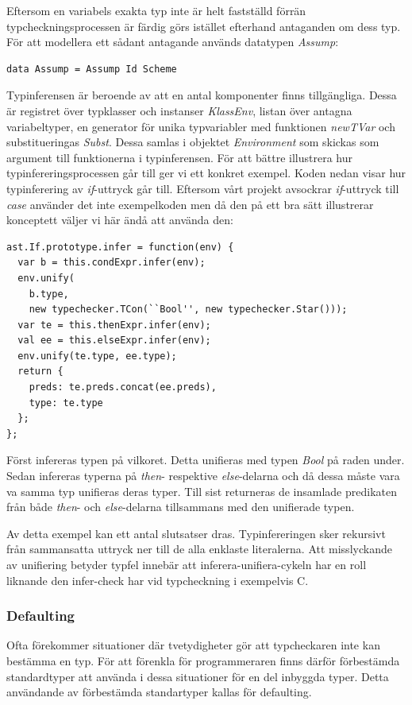 Eftersom en variabels exakta typ inte är helt fastställd förrän typcheckningsprocessen är färdig görs istället efterhand antaganden om dess typ. För att modellera ett sådant antagande används datatypen \emph{Assump}:
\begin{lstlisting}
data Assump = Assump Id Scheme
\end{lstlisting}

Typinferensen är beroende av att en antal komponenter finns tillgängliga. Dessa är registret över typklasser och instanser \emph{KlassEnv}, listan över antagna variabeltyper, en generator för unika typvariabler med funktionen \emph{newTVar} och substitueringas \emph{Subst}. Dessa samlas i objektet \emph{Environment} som skickas som argument till funktionerna i typinferensen. 
För att bättre illustrera hur typinfereringsprocessen går till ger vi ett konkret exempel. Koden nedan visar hur typinferering av \emph{if}-uttryck går till. Eftersom vårt projekt avsockrar \emph{if}-uttryck till \emph{case} använder det inte exempelkoden men då den på ett bra sätt illustrerar konceptett väljer vi här ändå att använda den:

\begin{lstlisting}
ast.If.prototype.infer = function(env) {
  var b = this.condExpr.infer(env);
  env.unify(
    b.type,
    new typechecker.TCon(``Bool'', new typechecker.Star()));
  var te = this.thenExpr.infer(env);
  val ee = this.elseExpr.infer(env);
  env.unify(te.type, ee.type);
  return {
    preds: te.preds.concat(ee.preds),
    type: te.type
  };
};
\end{lstlisting}
Först infereras typen på vilkoret. Detta unifieras med typen \emph{Bool} på raden under. Sedan infereras typerna på \emph{then}- respektive \emph{else}-delarna och då dessa måste vara va samma typ unifieras deras typer. Till sist returneras de insamlade predikaten från både \emph{then}- och \emph{else}-delarna tillsammans med den unifierade typen.

Av detta exempel kan ett antal slutsatser dras. Typinfereringen sker rekursivt från sammansatta uttryck ner till de alla enklaste literalerna. Att misslyckande av unifiering betyder typfel innebär att inferera-unifiera-cykeln har en roll liknande den infer-check har vid typcheckning i exempelvis C.

\subsubsection{Defaulting}
Ofta förekommer situationer där tvetydigheter gör att typcheckaren inte kan bestämma en typ. För att förenkla för programmeraren finns därför förbestämda standardtyper att använda i dessa situationer för en del inbyggda typer. Detta användande av förbestämda standartyper kallas för defaulting.

